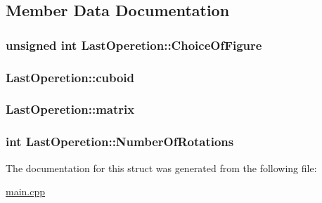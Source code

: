 \subsection{Member Data Documentation}
\subsubsection[{\texorpdfstring{Choice\+Of\+Figure}{ChoiceOfFigure}}]{\setlength{\rightskip}{0pt plus 5cm}unsigned int Last\+Operetion\+::\+Choice\+Of\+Figure}\hypertarget{struct_last_operetion_abd8b292d5d12fc6876e104a98d427159}{}\label{struct_last_operetion_abd8b292d5d12fc6876e104a98d427159}
\subsubsection[{\texorpdfstring{cuboid}{cuboid}}]{ Last\+Operetion\+::cuboid}\hypertarget{struct_last_operetion_a00772e4d91de1dddb951645ad1926cde}{}\label{struct_last_operetion_a00772e4d91de1dddb951645ad1926cde}
\subsubsection[{\texorpdfstring{matrix}{matrix}}]{ Last\+Operetion\+::matrix}\hypertarget{struct_last_operetion_a9e056b60f7eb77a7e68423b67e150ce4}{}\label{struct_last_operetion_a9e056b60f7eb77a7e68423b67e150ce4}
\subsubsection[{\texorpdfstring{Number\+Of\+Rotations}{NumberOfRotations}}]{\setlength{\rightskip}{0pt plus 5cm}int Last\+Operetion\+::\+Number\+Of\+Rotations}\hypertarget{struct_last_operetion_a9aeead144af43fc85e93e4761c4d4092}{}\label{struct_last_operetion_a9aeead144af43fc85e93e4761c4d4092}


The documentation for this struct was generated from the following file\+:\begin{DoxyCompactItemize}
\item 
\hyperlink{main_8cpp}{main.\+cpp}\end{DoxyCompactItemize}
